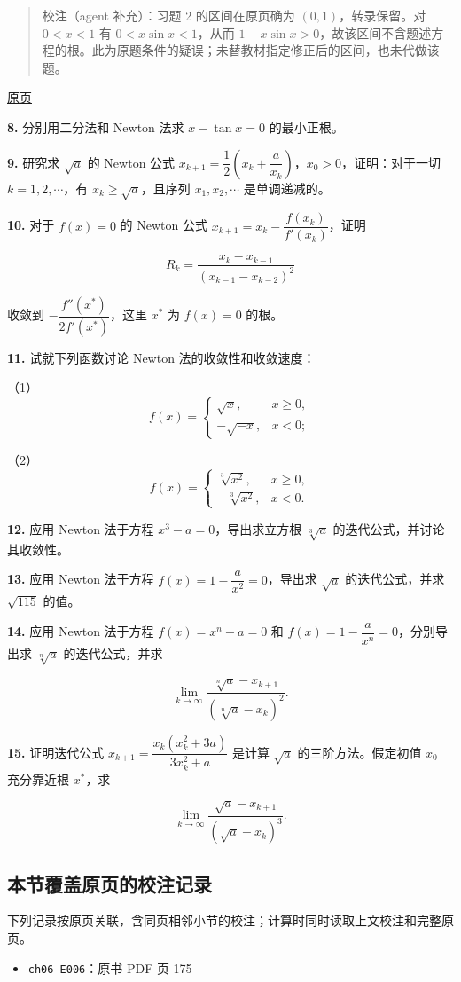 \documentclass[
  10pt,
  fontset=fandol]{ctexart}
\providecommand{\tightlist}{%
  \setlength{\itemsep}{0pt}\setlength{\parskip}{0pt}}
\begin{document}
\begin{quote}
校注（agent 补充）：习题 2 的区间在原页确为 \((0,1)\)，转录保留。对 \(0<x<1\) 有 \(0<x\sin x<1\)，从而 \(1-x\sin x>0\)，故该区间不含题述方程的根。此为原题条件的疑误；未替教材指定修正后的区间，也未代做该题。
\end{quote}

\href{../../source-images/pdf-176.jpeg}{原页}

\textbf{8.} 分别用二分法和 Newton 法求 \(x-\tan x=0\) 的最小正根。

\textbf{9.} 研究求 \(\sqrt{a}\) 的 Newton 公式 \(x_{k+1}=\dfrac{1}{2}\left(x_k+\dfrac{a}{x_k}\right)\)，\(x_0>0\)，证明：对于一切 \(k=1,2,\cdots\)，有 \(x_k\geqslant\sqrt{a}\)，且序列 \(x_1,x_2,\cdots\) 是单调递减的。

\textbf{10.} 对于 \(f(x)=0\) 的 Newton 公式 \(x_{k+1}=x_k-\dfrac{f(x_k)}{f'(x_k)}\)，证明

\[
R_k=\frac{x_k-x_{k-1}}{(x_{k-1}-x_{k-2})^2}
\]

收敛到 \(-\dfrac{f''(x^*)}{2f'(x^*)}\)，这里 \(x^*\) 为 \(f(x)=0\) 的根。

\textbf{11.} 试就下列函数讨论 Newton 法的收敛性和收敛速度：

（1） \[
f(x)=\begin{cases}
\sqrt{x},&x\geqslant0,\\
-\sqrt{-x},&x<0;
\end{cases}
\]

（2） \[
f(x)=\begin{cases}
\sqrt[3]{x^2},&x\geqslant0,\\
-\sqrt[3]{x^2},&x<0.
\end{cases}
\]

\textbf{12.} 应用 Newton 法于方程 \(x^3-a=0\)，导出求立方根 \(\sqrt[3]{a}\) 的迭代公式，并讨论其收敛性。

\textbf{13.} 应用 Newton 法于方程 \(f(x)=1-\dfrac{a}{x^2}=0\)，导出求 \(\sqrt{a}\) 的迭代公式，并求 \(\sqrt{115}\) 的值。

\textbf{14.} 应用 Newton 法于方程 \(f(x)=x^n-a=0\) 和 \(f(x)=1-\dfrac{a}{x^n}=0\)，分别导出求 \(\sqrt[n]{a}\) 的迭代公式，并求

\[
\lim_{k\to\infty}\frac{\sqrt[n]{a}-x_{k+1}}{(\sqrt[n]{a}-x_k)^2}.
\]

\textbf{15.} 证明迭代公式 \(x_{k+1}=\dfrac{x_k(x_k^2+3a)}{3x_k^2+a}\) 是计算 \(\sqrt{a}\) 的三阶方法。假定初值 \(x_0\) 充分靠近根 \(x^*\)，求

\[
\lim_{k\to\infty}\frac{\sqrt{a}-x_{k+1}}{(\sqrt{a}-x_k)^3}.
\]

\subsection{本节覆盖原页的校注记录}\label{ux672cux8282ux8986ux76d6ux539fux9875ux7684ux6821ux6ce8ux8bb0ux5f55}

下列记录按原页关联，含同页相邻小节的校注；计算时同时读取上文校注和完整原页。

\begin{itemize}
\tightlist
\item
  \texttt{ch06-E006}：原书 PDF 页 175
\end{itemize}
\end{document}
